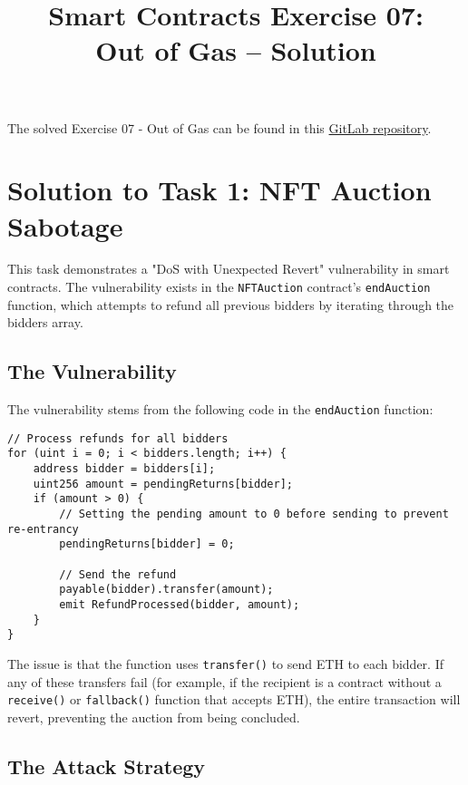 \documentclass[12pt]{article}
\title{Smart Contracts Exercise 07: \\ Out of Gas -- Solution}
\author{}
\date{}
\begin{document}
\maketitle

\noindent
The solved Exercise 07 - Out of Gas can be found in this \href{https://gitlab.fel.cvut.cz/radovluk/smart-contracts-exercises/-/tree/main/07-Out-of-Gas/solution/solution-code?ref_type=heads}{GitLab repository}.

\section*{Solution to Task 1: NFT Auction Sabotage}

This task demonstrates a "DoS with Unexpected Revert" vulnerability in smart contracts. The vulnerability exists in the \texttt{NFTAuction} contract's \texttt{endAuction} function, which attempts to refund all previous bidders by iterating through the bidders array. 

\subsection*{The Vulnerability}

The vulnerability stems from the following code in the \texttt{endAuction} function:

\noindent
\begin{minipage}{\textwidth}
\begin{lstlisting}[language=Solidity]
// Process refunds for all bidders
for (uint i = 0; i < bidders.length; i++) {
    address bidder = bidders[i];
    uint256 amount = pendingReturns[bidder];
    if (amount > 0) {
        // Setting the pending amount to 0 before sending to prevent re-entrancy
        pendingReturns[bidder] = 0;

        // Send the refund
        payable(bidder).transfer(amount);
        emit RefundProcessed(bidder, amount);
    }
}
\end{lstlisting}
\end{minipage}

The issue is that the function uses \texttt{transfer()} to send ETH to each bidder. If any of these transfers fail (for example, if the recipient is a contract without a \texttt{receive()} or \texttt{fallback()} function that accepts ETH), the entire transaction will revert, preventing the auction from being concluded.

\subsection*{The Attack Strategy}
\end{document}
